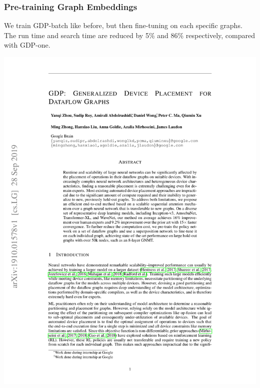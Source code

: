 \documentclass[12pt,aspectratio=169]{beamer}
\begin{document}
    \begin{frame}
        \frametitle{Pre-training Graph Embeddings}

        We train GDP-batch like before, but then fine-tuning on each specific graphs. The run time and search time
        are reduced by 5\% and 86\% respectively, compared with GDP-one.

        \centering
        \includegraphics[page=8,trim=6.4cm 12.5cm 5.8cm 9.8cm,clip]{GDP.pdf}
    \end{frame}

    \appendix

\end{document}
